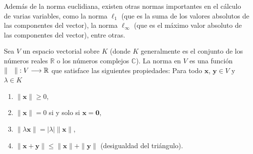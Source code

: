 Además de la norma euclidiana, existen otras normas importantes en el cálculo de varias variables, como la norma $\ell_1$ (que es la suma de los valores absolutos de las componentes del vector), la norma $\ell_{\infty}$ (que es el máximo valor absoluto de las componentes del vector), entre otras.

\begin{definition}
    Sea $V$ un espacio vectorial sobre $K$ (donde $K$ generalmente es el conjunto de los números reales $\mathbb{R}$ o los números complejos $\mathbb{C}$). La norma en $V$ es una función $\| \quad \| : V \longrightarrow \RR$ que satisface las siguientes propiedades: Para todo $\mathbf{x}$, $\mathbf{y} \in V$ y $\lambda \in K$
    \begin{enumerate}[label=\roman*.]
        \item $\| \mathbf{x} \| \geq 0$,
        \item $\| \mathbf{x} \| = 0$ si y solo si $\mathbf{x} = \mathbf{0}$,
        \item $\| \lambda \mathbf{x} \| = |\lambda| \| \mathbf{x} \|$,
        \item $\| \mathbf{x} + \mathbf{y} \| \leq \| \mathbf{x} \| + \| \mathbf{y} \|$ (desigualdad del triángulo).
    \end{enumerate}
\end{definition}

